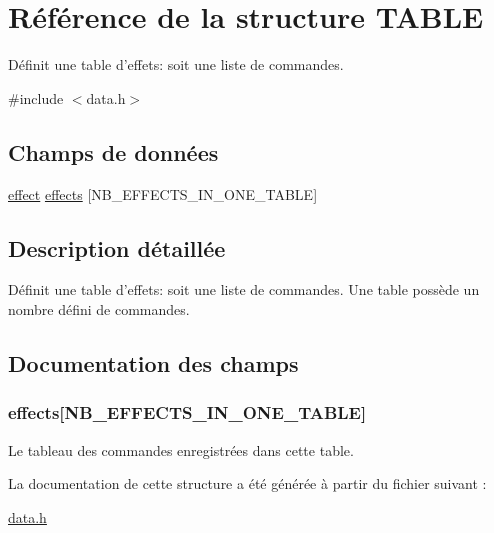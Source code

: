 \hypertarget{struct_t_a_b_l_e}{
\section{Référence de la structure TABLE}
\label{struct_t_a_b_l_e}
}


Définit une table d'effets: soit une liste de commandes.  




{\ttfamily \#include $<$data.h$>$}

\subsection*{Champs de données}
\begin{DoxyCompactItemize}
\item 
\hyperlink{struct_e_f_f_e_c_t}{effect} \hyperlink{struct_t_a_b_l_e_aa7196468994f526bb6523a0e4e165954}{effects} \mbox{[}NB\_\-EFFECTS\_\-IN\_\-ONE\_\-TABLE\mbox{]}
\end{DoxyCompactItemize}


\subsection{Description détaillée}
Définit une table d'effets: soit une liste de commandes. Une table possède un nombre défini de commandes. 

\subsection{Documentation des champs}
\hypertarget{struct_t_a_b_l_e_aa7196468994f526bb6523a0e4e165954}{
\subsubsection[{effects}]{ {\bf effects}\mbox{[}NB\_\-EFFECTS\_\-IN\_\-ONE\_\-TABLE\mbox{]}}}
\label{struct_t_a_b_l_e_aa7196468994f526bb6523a0e4e165954}
Le tableau des commandes enregistrées dans cette table. 

La documentation de cette structure a été générée à partir du fichier suivant :\begin{DoxyCompactItemize}
\item 
\hyperlink{data_8h}{data.h}\end{DoxyCompactItemize}
